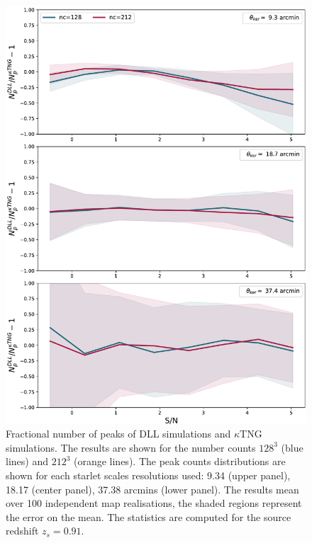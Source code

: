 \documentclass[twocolumn,twocolappendix]{aastex63}
\begin{document}
\renewcommand{\thefigure}{C\arabic{figure}}
\setcounter{figure}{1}
\begin{figure}\label{peaks_high}
    \centering
    \includegraphics[width=\columnwidth]{paper/figures/res_peak_DLL_vs_ktng_high.pdf}
    \caption{Fractional number of peaks of DLL simulations and $\kappa$TNG simulations. The results are shown for the number counts $128^3$ (blue lines) and $212^3$ (orange lines). The peak counts distributions are shown for each starlet scales resolutions used: 9.34 (upper panel), 18.17 (center panel), 37.38 arcmins (lower panel).
  The results mean over 100 independent map realisations, the shaded regions represent the error on the mean. The statistics are computed for the source redshift $z_s=0.91$. }
\end{figure}
\end{document}
